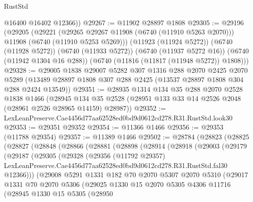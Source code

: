 \begin{lexlean}{RustStd}
\begin{coremodule}
        @16400
        @16402
        @12366))
@29267 := @11902 @28897 @1808
@29305 := @29196
    (@29205
      (@29221
        (@29265 @29267 @11908 (@6740 (@11910 @5263 @2070)))
        @11908
        (@6740 (@11910 @5253 @5269)))
      (@11923 (@11924 @5272))
      (@6740 (@11928 @5272))
      (@6740 (@11933 @5272))
      (@6740 (@11937 @5272 @16))
      (@6740 (@11942 @1304 @16 @288))
      (@6740 (@11816 (@11817 (@11948 @5272)) @1808)))
@29328 := @29005
    @1838
    @29007
    @5282
    @307
    @1316
    @288
    @2070
    @2425
    @2070
    @5289
    (@13489 @28897 @1808 @307 @288 @2425 (@13537 @28897 @1808 @304 @288 @2424 @13549))
@29351 := @28935
    @1314
    @134
    @35
    @288
    @2070
    @2528
    @1838
    @1466
    (@28945 @134 @35 @2528 (@28951 @133 @33 @14 @2526 @2048 (@28961 @2526 @28965 @14159) @28987))
@29352 := LexLeanPreserve.Cae4456d77aa62528ed0bd9d0612cd278.R31.RustStd.look30
@29353 := @29351 @29352
@29354 := @11366 @1466
@29356 := @29353 (@11788 @29354)
@29357 := @11389 @1466
@29502 := @28784
    (@28823
      (@28825
        (@28827
          (@28848
            (@28866
              (@28881
                (@28898
                  (@28914
                    (@28918
                      (@29003
                        (@29179
                          (@29187
                            (@29305
                              (@29328
                                (@29356
                                  (@11792 @29357)
                                  LexLeanPreserve.Cae4456d77aa62528ed0bd9d0612cd278.R31.RustStd.fal30
                                  @12366)))
                            (@29008
                              @5291
                              @1331
                              @182
                              @70
                              @2070
                              @5307
                              @2070
                              @5310
                              (@29017
                                @1331
                                @70
                                @2070
                                @5306
                                (@29025
                                  @1330
                                  @15
                                  @2070
                                  @5305
                                  @4306
                                  @11716
                                  (@28945
                                    @1330
                                    @15
                                    @5305
                                    (@28950

\end{coremodule}
\end{lexlean}
